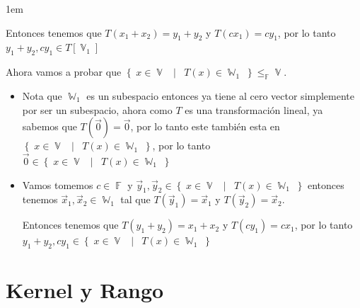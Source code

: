 \documentclass[12pt, fleqn]{report}                             %
\newenvironment{SmallIndentation}[1][0.75em]                    %
        {\begin{adjustwidth}{#1}{}\begin{footnotesize}}             %
        {\end{footnotesize}\end{adjustwidth}}                       %
\DeclareMathOperator \Space     {\quad}                         %
\DeclareMathOperator \MiniSpace {\;}                            %
\newcommand \Such           {\MiniSpace | \MiniSpace}           %
\theoremstyle{break}                                            %
\DeclareMathOperator \GenericField {\mathbb{F}}                 %
\DeclareMathOperator \VectorSet    {\mathbb{V}}                 %
\DeclareMathOperator \SubVectorSet {\mathbb{W}}                 %
\newcommand{\Set}[1]            {\left\{ \; #1 \; \right\}}     %
\begin{document}
\begin{itemize}
\begin{SmallIndentation}[1em]
\begin{itemize}
                                    Entonces tenemos que $T(x_1 + x_2) = y_1 + y_2$ y $T(cx_1) = cy_1$, por lo tanto
                                    $y_1 + y_2, cy_1 \in T[\VectorSet_1]$
                            \end{itemize}

                            Ahora vamos a probar que $\Set{x \in \VectorSet \Such T(x) \in \SubVectorSet_1} 
                            \leq_{\GenericField} \VectorSet$.
                            \begin{itemize}
                                \item 
                                    Nota que $\SubVectorSet_1$ es un subespacio entonces ya tiene al cero
                                    vector simplemente por ser un subespacio, ahora como $T$ es una transformación
                                    lineal, ya sabemos que $T(\vec 0) = \vec 0$, por lo tanto este también 
                                    esta en $\Set{x \in \VectorSet \Such T(x) \in \SubVectorSet_1}$, por lo
                                    tanto $\vec 0 \in \Set{x \in \VectorSet \Such T(x) \in \SubVectorSet_1}$

                                \item
                                    Vamos tomemos $c \in \GenericField$ y 
                                    $\vec y_1, \vec y_2 \in \Set{x \in \VectorSet \Such T(x) \in \SubVectorSet_1}$
                                    entonces tenemos $\vec x_1, \vec x_2 \in \SubVectorSet_1$ tal que 
                                    $T(\vec y_1) = \vec x_1$ y $T(\vec y_2) = \vec x_2$.

                                    Entonces tenemos que $T(y_1 + y_2) = x_1 + x_2$ y $T(cy_1) = cx_1$, por lo tanto
                                    $y_1 + y_2, cy_1 \in \Set{x \in \VectorSet \Such T(x) \in \SubVectorSet_1}$
                            \end{itemize}

                        \end{SmallIndentation}
                            
                        
                \end{itemize}


        \clearpage
        \section{Kernel y Rango}
\end{document}
